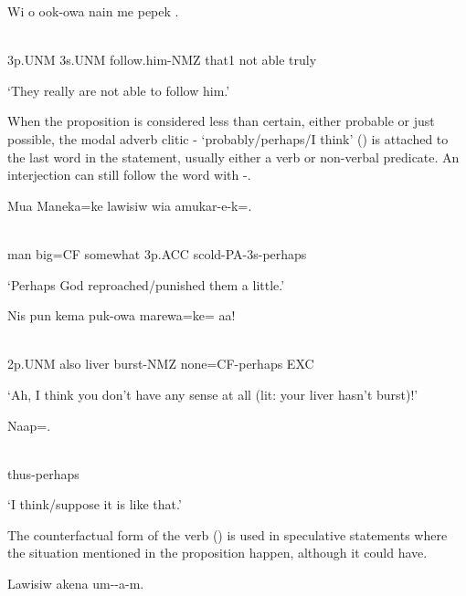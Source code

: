 \ea%
\label{ex:x1051}
\gll Wi  o  ook-owa  nain  me  pepek  . \\
      \\
\glt
\z

3p.UNM  3s.UNM  follow.him-NMZ  that1  not  able  truly

`They really are not able to follow him.'

When the proposition is considered less than certain, either probable or just possible, the modal adverb clitic - `probably/perhaps/I think' () is attached to the last word in the statement, usually either a verb or non-verbal predicate. An interjection can still follow the word with -.

\ea%
\label{ex:x1052}
\gll Mua  Maneka=ke  lawisiw  wia  amukar-e-k=. \\
      \\
\glt
\z

man  big=CF  somewhat  3p.ACC  scold-PA-3s-perhaps

`Perhaps God reproached/punished them a little.'

\ea%
\label{ex:x1053}
\gll Nis  pun  kema  puk-owa  marewa=ke=  aa! \\
      \\
\glt
\z

2p.UNM  also  liver  burst-NMZ  none=CF-perhaps  EXC

`Ah, I think you don't have any sense at all (lit: your liver hasn't burst)!'

\ea%
\label{ex:x1071}
\gll Naap=. \\
      \\
\glt
\z

thus-perhaps

`I think/suppose it is like that.'

The counterfactual form of the verb () is used in speculative statements where the situation mentioned in the proposition  happen, although it could have. 

\ea%
\label{ex:x1054}
\gll Lawisiw  akena  um--a-m. \\
      \\
\glt
\z

